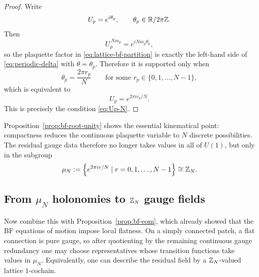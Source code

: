 \begin{proof}
Write
\begin{equation*}
U_p = e^{i\theta_p},
\qquad
\theta_p \in \mathbb{R}/2\pi\mathbb{Z}.
\end{equation*}
Then
\begin{equation*}
U_p^{\,Nm_p}=e^{iNm_p\theta_p},
\end{equation*}
so the plaquette factor in \eqref{eq:lattice-bf-partition} is exactly the left-hand side of \eqref{eq:periodic-delta} with $\theta=\theta_p$. Therefore it is supported only when
\begin{equation*}
\theta_p = \frac{2\pi r_p}{N}
\qquad
\text{for some }r_p\in\{0,1,\dots,N-1\},
\end{equation*}
which is equivalent to
\begin{equation*}
U_p = e^{2\pi i r_p/N}.
\end{equation*}
This is precisely the condition \eqref{eq:Up-N}.
\end{proof}

\noindent Proposition~\ref{prop:bf-root-unity} shows the essential kinematical point: compactness reduces the continuous plaquette variable to $N$ discrete possibilities. The residual gauge data therefore no longer takes values in all of $U(1)$, but only in the subgroup
\begin{equation}\label{eq:muN}
\mu_N := \left\{e^{2\pi i r/N}\mid r=0,1,\dots,N-1\right\}\cong \mathbb{Z}_N.
\end{equation}

\subsection{From \texorpdfstring{$\mu_N$}{mu\_N} holonomies to \texorpdfstring{$\mathbb{Z}_N$}{Z\_N} gauge fields}

Now combine this with Proposition~\ref{prop:bf-eom}, which already showed that the BF equations of motion impose local flatness. On a simply connected patch, a flat connection is pure gauge, so after quotienting by the remaining continuous gauge redundancy one may choose representatives whose transition functions take values in $\mu_N$. Equivalently, one can describe the residual field by a $\mathbb{Z}_N$-valued lattice $1$-cochain.

\medskip

